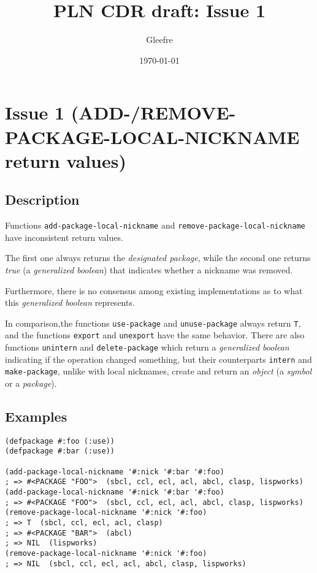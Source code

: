 \documentclass[11pt]{article}
\author{Gleefre}
\date{\today}
\title{PLN CDR draft: Issue 1}
\begin{document}
\maketitle

\section{Issue 1 (ADD-/REMOVE-PACKAGE-LOCAL-NICKNAME return values)}
\label{sec:org15469b4}
\subsection{Description}
\label{sec:orgcf78821}
Functions \texttt{add-package-local-nickname} and \texttt{remove-package-local-nickname} have
inconsistent return values.

The first one always returns the \emph{designated package}, while the second one
returns \emph{true} (a \emph{generalized boolean}) that indicates whether a nickname was
removed.

Furthermore, there is no consensus among existing implementations as to what this
\emph{generalized boolean} represents.

In comparison,the functions \texttt{use-package} and \texttt{unuse-package} always return \texttt{T},
and the functions \texttt{export} and \texttt{unexport} have the same behavior. There are also
functions \texttt{unintern} and \texttt{delete-package} which return a \emph{generalized boolean}
indicating if the operation changed something, but their counterparts \texttt{intern} and
\texttt{make-package}, unlike with local nicknames, create and return an \emph{object} (a
\emph{symbol} or a \emph{package}).
\subsection{Examples}
\label{sec:org77daeb1}
\begin{verbatim}
(defpackage #:foo (:use))
(defpackage #:bar (:use))

(add-package-local-nickname '#:nick '#:bar '#:foo)
; => #<PACKAGE "FOO">  (sbcl, ccl, ecl, acl, abcl, clasp, lispworks)
(add-package-local-nickname '#:nick '#:bar '#:foo)
; => #<PACKAGE "FOO">  (sbcl, ccl, ecl, acl, abcl, clasp, lispworks)
(remove-package-local-nickname '#:nick '#:foo)
; => T  (sbcl, ccl, ecl, acl, clasp)
; => #<PACKAGE "BAR">  (abcl)
; => NIL  (lispworks)
(remove-package-local-nickname '#:nick '#:foo)
; => NIL  (sbcl, ccl, ecl, acl, abcl, clasp, lispworks)
\end{verbatim}
\end{document}
